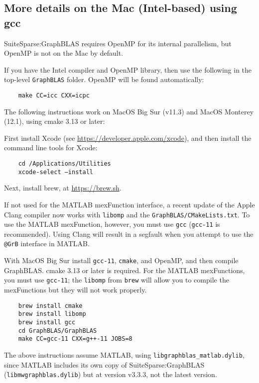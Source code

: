 \documentclass[12pt]{article}
\begin{document}
\subsection{More details on the Mac (Intel-based) using gcc}

SuiteSparse:GraphBLAS requires OpenMP for its internal parallelism, but
OpenMP is not on the Mac by default.

If you have the Intel compiler and OpenMP library, then use the following
in the top-level \verb'GraphBLAS' folder.  OpenMP will be found automatically:

    {\small
    \begin{verbatim}
    make CC=icc CXX=icpc \end{verbatim} }

The following instructions work on MacOS Big Sur (v11.3)
and MacOS Monterey (12.1), using
cmake 3.13 or later:

First install Xcode (see \url{https://developer.apple.com/xcode}),
and then install the command line tools for Xcode:

    {\small
    \begin{verbatim}
    cd /Applications/Utilities
    xcode-select —install \end{verbatim} }

Next, install brew, at \url{https://brew.sh}.

If not used for the MATLAB mexFunction interface, a recent update of the Apple
Clang compiler now works with \verb'libomp' and the
\verb'GraphBLAS/CMakeLists.txt'.  To use the MATLAB mexFunction, however, you
must use \verb'gcc' (\verb'gcc-11' is recommended).  Using Clang will result in
a segfault when you attempt to use the \verb'@GrB' interface in MATLAB.

With MacOS Big Sur install \verb'gcc-11', \verb'cmake', and OpenMP, and then
compile GraphBLAS.  cmake 3.13 or later is required.  For the MATLAB
mexFunctions, you must use \verb'gcc-11'; the \verb'libomp' from \verb'brew'
will allow you to compile the mexFunctions but they will not work properly.

    {\small
    \begin{verbatim}
    brew install cmake
    brew install libomp
    brew install gcc
    cd GraphBLAS/GraphBLAS
    make CC=gcc-11 CXX=g++-11 JOBS=8 \end{verbatim} }

The above instructions assume MATLAB, using
\verb'libgraphblas_matlab.dylib', since MATLAB includes its
own copy of SuiteSparse:GraphBLAS (\verb'libmwgraphblas.dylib') but at version
v3.3.3, not the latest version.
\end{document}
